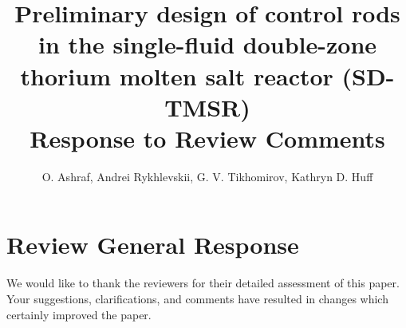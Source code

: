 \documentclass[answers,11pt]{exam}
\begin{document}


%

\title{Preliminary design of control rods in the single-fluid double-zone thorium molten salt reactor (SD-TMSR)\\
\large Response to Review Comments}
\author{O. Ashraf, Andrei Rykhlevskii, G. V. Tikhomirov, Kathryn D. Huff}



%
\maketitle
\section*{Review General Response}
We would like to thank the reviewers for their detailed assessment of
this paper. Your suggestions, clarifications, and comments have resulted in 
changes which certainly improved the paper.
\end{document}

